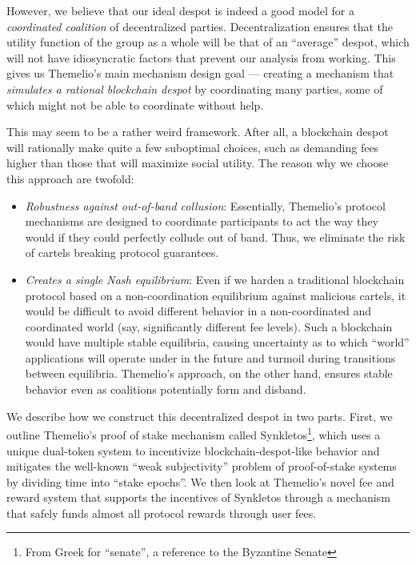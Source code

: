 \documentclass[letterpaper,12pt,oneside]{article}
\begin{document}
However, we believe that our ideal despot is indeed a good model for a \emph{coordinated coalition} of decentralized parties. Decentralization ensures that the utility function of the group as a whole will be that of an ``average'' despot, which will not have idiosyncratic factors that prevent our analysis from working. This gives us Themelio's main  mechanism design goal --- creating a mechanism that \emph{simulates a rational blockchain despot} by coordinating many parties, some of which might not be able to coordinate without help.

This may seem to be a rather weird framework. After all, a blockchain despot will rationally make quite a few suboptimal choices, such as demanding fees higher than those that will maximize social utility. The reason why we choose this approach are twofold:

\begin{itemize}
    \item \emph{Robustness against out-of-band collusion}: Essentially, Themelio's protocol mechanisms are designed to coordinate participants to act the way they would if they could perfectly collude out of band. Thus, we eliminate the risk of cartels breaking protocol guarantees.
    \item \emph{Creates a single Nash equilibrium}: Even if we harden a traditional blockchain protocol based on a non-coordination equilibrium against malicious cartels, it would be difficult to avoid different behavior in a non-coordinated and coordinated world (say, significantly different fee levels). Such a blockchain would have multiple stable equilibria, causing uncertainty as to which ``world'' applications will operate under in the future and turmoil during transitions between equilibria. Themelio's approach, on the other hand, ensures stable behavior even as coalitions potentially form and disband.
\end{itemize}

We describe how we construct this decentralized despot in two parts. First, we outline Themelio's proof of stake mechanism called Synkletos\footnote{From Greek for ``senate'', a reference to the Byzantine Senate}, which uses a unique dual-token system to incentivize blockchain-despot-like behavior and mitigates the well-known ``weak subjectivity'' problem of proof-of-stake systems by dividing time into ``stake epochs''. We then look at Themelio's novel fee and reward system that supports the incentives of Synkletos through a mechanism that safely funds almost all protocol rewards through user fees.
\end{document}
